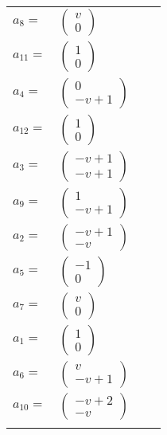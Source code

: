 \documentclass[1p]{elsarticle_modified}
\theoremstyle{definition}
\begin{document}
\begin{tabular}{m{7pt} m{180pt} m{7pt} m{180pt} }
\flushright $a_{8}=$&$\begin{pmatrix}v\\0\end{pmatrix}$ \\
\flushright $a_{11}=$&$\begin{pmatrix}1\\0\end{pmatrix}$ \\
\flushright $a_{4}=$&$\begin{pmatrix}0\\- v+1\end{pmatrix}$ \\
\flushright $a_{12}=$&$\begin{pmatrix}1\\0\end{pmatrix}$ \\
\flushright $a_{3}=$&$\begin{pmatrix}- v+1\\- v+1\end{pmatrix}$ \\
\flushright $a_{9}=$&$\begin{pmatrix}1\\- v+1\end{pmatrix}$ \\
\flushright $a_{2}=$&$\begin{pmatrix}- v+1\\- v\end{pmatrix}$ \\
\flushright $a_{5}=$&$\begin{pmatrix}-1\\0\end{pmatrix}$ \\
\flushright $a_{7}=$&$\begin{pmatrix}v\\0\end{pmatrix}$ \\
\flushright $a_{1}=$&$\begin{pmatrix}1\\0\end{pmatrix}$ \\
\flushright $a_{6}=$&$\begin{pmatrix}v\\- v+1\end{pmatrix}$ \\
\flushright $a_{10}=$&$\begin{pmatrix}- v+2\\- v\end{pmatrix}$\\&\end{tabular}
\end{document}
